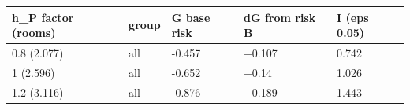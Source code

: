 \begingroup\small
\setlength{\tabcolsep}{3pt}
\renewcommand{\arraystretch}{1.04}
\begin{tabularx}{\linewidth}{XXXXX}
\toprule
h\_P factor (rooms) & group & G base risk & dG from risk B & I (eps 0.05) \\
\midrule
0.8 (2.077) & all & -0.457 & +0.107 & 0.742 \\
1 (2.596) & all & -0.652 & +0.14 & 1.026 \\
1.2 (3.116) & all & -0.876 & +0.189 & 1.443 \\
\bottomrule
\end{tabularx}
\endgroup
